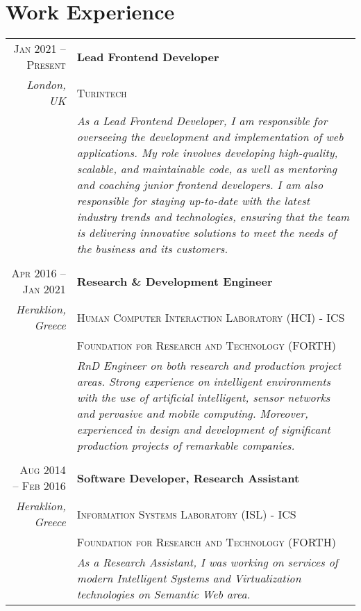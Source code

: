 \documentclass[11pt]{article}
\begin{document}
\section{Work Experience}

\begin{longtable}{r|p{12.5cm}}

\textsc{Jan 2021 – Present} & \textbf{Lead Frontend Developer} \\
\footnotesize{\textit{London, UK}} & \textsc{Turintech } \\
& \footnotesize{\textit{As a Lead Frontend Developer, I am responsible for overseeing the development and implementation of web applications. My role involves developing high-quality, scalable, and maintainable code, as well as mentoring and coaching junior frontend developers. I am also responsible for staying up-to-date with the latest industry trends and technologies, ensuring that the team is delivering innovative solutions to meet the needs of the business and its customers.}} \\

\multicolumn{2}{c}{} \\
\textsc{Apr 2016 – Jan 2021} & \textbf{Research \& Development Engineer} \\
\footnotesize{\textit{Heraklion, Greece}} & \textsc{Human Computer Interaction Laboratory (HCI) - ICS } \\
& \textsc{Foundation for Research and Technology (FORTH)} \\
& \footnotesize{\textit{RnD Engineer on both research and production project areas. Strong experience on intelligent environments with the use of artificial intelligent, sensor networks and pervasive and mobile computing. Moreover, experienced in design and development of significant production projects of remarkable companies.}} \\

\multicolumn{2}{c}{} \\
\textsc{Aug 2014 – Feb 2016} & \textbf{Software Developer, Research Assistant} \\
\footnotesize{\textit{Heraklion, Greece}} & \textsc{Information Systems Laboratory (ISL) - ICS } \\
& \textsc{Foundation for Research and Technology (FORTH)} \\
& \footnotesize{\textit{As a Research Assistant, I was working on services of modern Intelligent Systems and Virtualization technologies on Semantic Web area.}} \\


\end{longtable}
\end{document}
